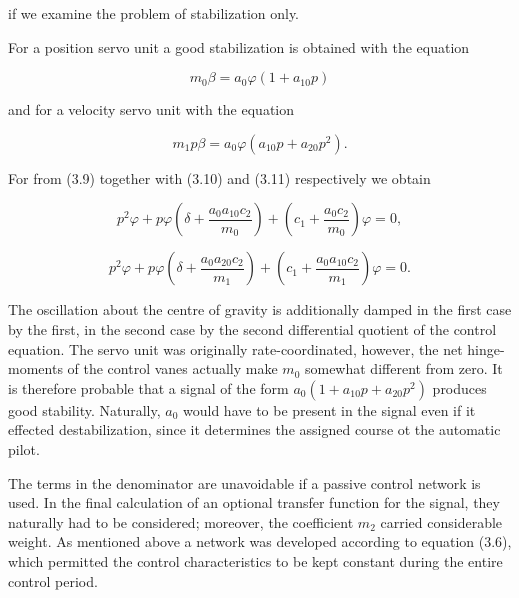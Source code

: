 \documentclass[12pt, a4paper]{article}
\begin{document}
if we examine the problem of stabilization only.

For a position servo unit a good stabilization is obtained with the equation

\begin{equation}
  m_{0}\beta=a_{0}\varphi(1+a_{10}p)
\end{equation}

and for a velocity servo unit with the equation

\begin{equation}
  m_{1}p\beta=a_{0}\varphi(a_{10}p+a_{20}p^{2}).
\end{equation}

For from (3.9) together with (3.10) and (3.11) respectively we obtain

\begin{equation}
  p^{2}\varphi+p\varphi\left(\delta+\frac{a_{0}a_{10}c_{2}}{m_{0}}\right)+\left(c_{1}+\frac{a_{0}c_{2}}{m_{0}}\right)\varphi=0,
\end{equation}

\begin{equation}
  p^{2}\varphi+p\varphi\left(\delta+\frac{a_{0}a_{20}c_{2}}{m_{1}}\right)+\left(c_{1}+\frac{a_{0}a_{10}c_{2}}{m_{1}}\right)\varphi=0.
\end{equation}

The oscillation about the centre of gravity is additionally damped in the first case by the first, in the second case by the second differential quotient of the control equation. The servo unit was originally rate-coordinated, however, the net hinge-moments of the control vanes actually make $m_{0}$ somewhat different from zero. It is therefore probable that a signal of the form $a_{0}(1+a_{10}p+a_{20}p^{2})$ produces good stability. Naturally, $a_{0}$ would have to be present in the signal even if it effected destabilization, since it determines the assigned course ot the automatic pilot.

The terms in the denominator are unavoidable if a passive control network is used. In the final calculation of an optional transfer function for the signal, they naturally had to be considered; moreover, the coefficient $m_{2}$ carried considerable weight. As mentioned above a network was developed according to equation (3.6), which permitted the control characteristics to be kept constant during the entire control period.
\end{document}
